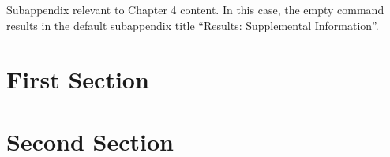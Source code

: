 Subappendix relevant to Chapter 4 content. In this case, the empty \noexpand\subappendix command results in the default subappendix title ``Results: Supplemental Information''.
\section{First Section}\label{chap4:app:sec:one}

\section{Second Section}\label{chap4:app:sec:two}


\endinput
